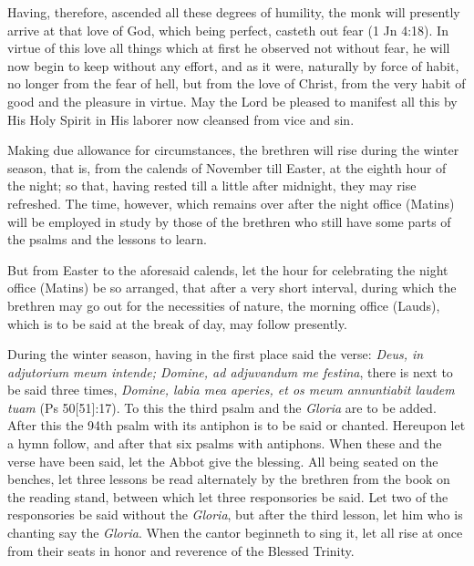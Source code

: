 Having, therefore, ascended all these degrees of humility, the monk will presently arrive at that love of God, which being perfect, casteth out fear (1 Jn 4:18). In virtue of this love all things which at first he observed not without fear, he will now begin to keep without any effort, and as it were, naturally by force of habit, no longer from the fear of hell, but from the love of Christ, from the very habit of good and the pleasure in virtue. May the Lord be pleased to manifest all this by His Holy Spirit in His laborer now cleansed from vice and sin.


Making due allowance for circumstances, the brethren will rise during the winter season, that is, from the calends of November till Easter, at the eighth hour of the night; so that, having rested till a little after midnight, they may rise refreshed. The time, however, which remains over after the night office (Matins) will be employed in study by those of the brethren who still have some parts of the psalms and the lessons to learn.

But from Easter to the aforesaid calends, let the hour for celebrating the night office (Matins) be so arranged, that after a very short interval, during which the brethren may go out for the necessities of nature, the morning office (Lauds), which is to be said at the break of day, may follow presently.


During the winter season, having in the first place said the verse: \emph{Deus, in adjutorium meum intende; Domine, ad adjuvandum me festina}, there is next to be said three times, \emph{Domine, labia mea aperies, et os meum annuntiabit laudem tuam} (Ps 50[51]:17). To this the third psalm and the \emph{Gloria} are to be added. After this the 94th psalm with its antiphon is to be said or chanted. Hereupon let a hymn follow, and after that six psalms with antiphons. When these and the verse have been said, let the Abbot give the blessing. All being seated on the benches, let three lessons be read alternately by the brethren from the book on the reading stand, between which let three responsories be said. Let two of the responsories be said without the \emph{Gloria}, but after the third lesson, let him who is chanting say the \emph{Gloria}. When the cantor beginneth to sing it, let all rise at once from their seats in honor and reverence of the Blessed Trinity.

